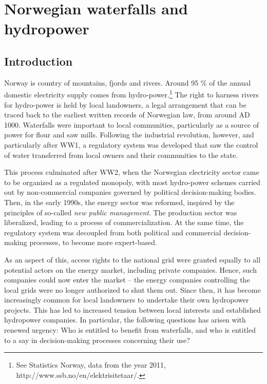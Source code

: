 \chapter{Norwegian waterfalls and hydropower}\label{chap:3}

\section{Introduction}\label{sec:into3}

Norway is country of mountains, fjords and rivers. Around 95 \% of the annual domestic electricity supply comes from hydro-power.\footnote{See Statistics Norway, data from the year 2011, http://www.ssb.no/en/elektrisitetaar/.} The right to harness rivers for hydro-power is held by local landowners, a legal arrangement that can be traced back to the earliest written records of Norwegian law, from around AD 1000. Waterfalls were important to local communities, particularly as a source of power for flour and saw mills. Following the industrial revolution, however, and particularly after WW1, a regulatory system was developed that saw the control of water transferred from local owners and their communities to the state.

This process culminated after WW2, when the Norwegian electricity sector came to be organized as a regulated monopoly, with most hydro-power schemes carried out by non-commercial companies governed by political decision-making bodies. Then, in the early 1990s, the energy sector was reformed, inspired by the principles of so-called {\it new public management}. The production sector was liberalized, leading to a process of commercialization. At the same time, the regulatory system was decoupled from both political and commercial decision-making processes, to become more expert-based.

As an aspect of this, access rights to the national grid were granted equally to all potential actors on the energy market, including private companies. Hence, such companies could now enter the market -- the energy companies controlling the local grids were no longer authorized to shut them out. Since then, it has become increasingly common for local landowners to undertake their own hydropower projects. This has led to increased tension between local interests and established hydropower companies. In particular, the following questions has arisen with renewed urgency: Who is entitled to benefit from waterfalls, and who is entitled to a say in decision-making processes concerning their use?

